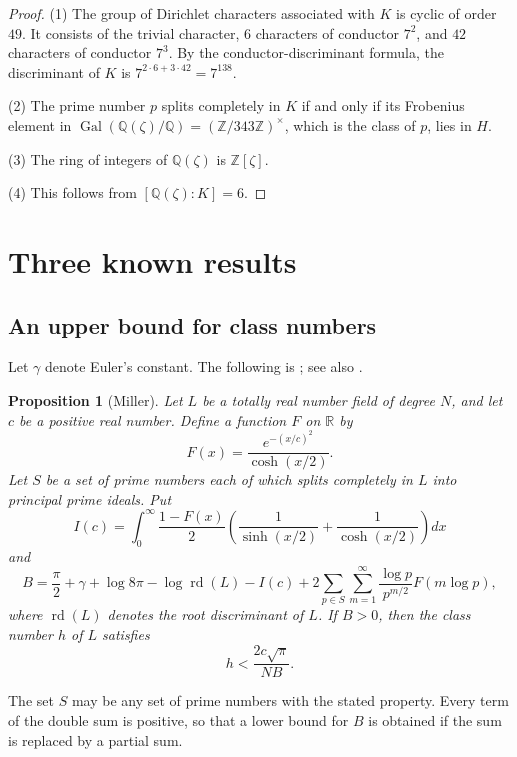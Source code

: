 \documentclass[11pt]{amsart}
\theoremstyle{plain}
\newtheorem{proposition}[theorem]{Proposition}
\theoremstyle{definition}
\begin{document}
\begin{proof}
(1) The group of Dirichlet characters associated with $K$ is cyclic of order $49$.
It consists of the trivial character, $6$ characters of conductor $7^2$, and $42$ characters of conductor $7^3$.
By the conductor-discriminant formula, the discriminant of $K$ is $7^{2 \cdot 6 + 3 \cdot 42} = 7^{138}$.

(2) The prime number $p$ splits completely in $K$ if and only if its Frobenius element in $\operatorname{Gal}(\mathbb{Q}(\zeta)/\mathbb{Q}) = (\mathbb{Z}/343\mathbb{Z})^\times$, which is the class of $p$, lies in $H$.

(3) The ring of integers of $\mathbb{Q}(\zeta)$ is $\mathbb{Z}[\zeta]$.

(4) This follows from $[\mathbb{Q}(\zeta):K] = 6$.
\end{proof}

\section{Three known results} \label{sec:known}

\subsection{An upper bound for class numbers}

Let $\gamma$ denote Euler's constant.
The following is \cite[Lemma 5.1]{Mi14}; see also \cite[Lemma 1]{Mi15b}.

\begin{proposition}[Miller] \label{prop:miller}
Let $L$ be a totally real number field of degree $N$, and let $c$ be a positive real number.
Define a function $F$ on $\mathbb{R}$ by
\[
F(x) = \frac{e^{-(x/c)^2}}{\cosh(x/2)} .
\]
Let $S$ be a set of prime numbers each of which splits completely in $L$ into principal prime ideals.
Put
\[
I(c) = \int_0^\infty \frac{1 - F(x)}{2} \left( \frac{1}{\sinh(x/2)} + \frac{1}{\cosh(x/2)} \right) dx
\]
and
\[
B = \frac{\pi}{2} + \gamma + \log 8\pi - \log \operatorname{rd}(L) - I(c) + 2 \sum_{p \in S} \sum_{m=1}^{\infty} \frac{\log p}{p^{m/2}} F(m \log p),
\]
where $\operatorname{rd}(L)$ denotes the root discriminant of $L$.
If $B > 0$, then the class number $h$ of $L$ satisfies
\[
h < \frac{2c\sqrt{\pi}}{N B} .
\]
\end{proposition}

The set $S$ may be any set of prime numbers with the stated property.
Every term of the double sum is positive, so that a lower bound for $B$ is obtained if the sum is replaced by a partial sum.
\end{document}
